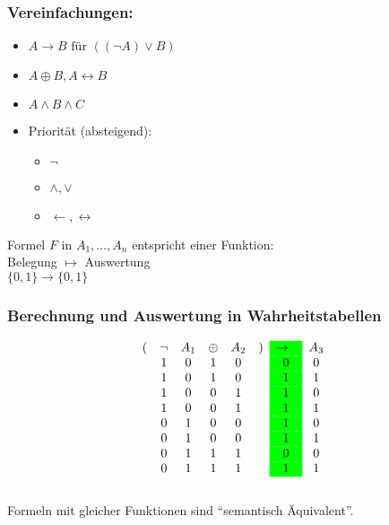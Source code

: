 \subsubsection{Vereinfachungen:}
\begin{itemize}
	\item $A \rightarrow B \text{ für } ( ( \neg A ) \vee B )$
	\item $A \oplus B , A \leftrightarrow B$
	\item $A \wedge B \wedge C$
	\item Priorität (absteigend):
	\begin{itemize}
		\item $\neg$
		\item $\wedge , \vee$
		\item $\leftarrow , \leftrightarrow$
	\end{itemize}
\end{itemize}
Formel $F$ in $A_1 , \dotsc , A_n$ entspricht einer Funktion:\\
Belegung $\mapsto$ Auswertung\\
$\{ 0 , 1 \} \rightarrow \{ 0 , 1 \}$

\subsubsection{Berechnung und Auswertung in Wahrheitstabellen}
\begin{gather*}
	\begin{array}{ c c c c c c >{\columncolor{green}}c c }
		(	& \neg	& A_1	& \oplus	& A_2	& )	& \rightarrow	& A_3	\\
			& 1		& 0		& 1		& 0		&	& 0			& 0		\\
			& 1		& 0		& 1		& 0		&	& 1			& 1		\\
			& 1		& 0		& 0		& 1		&	& 1			& 0		\\
			& 1		& 0		& 0		& 1		&	& 1			& 1		\\
			& 0		& 1		& 0		& 0		&	& 1			& 0		\\
			& 0		& 1		& 0		& 0		&	& 1			& 1		\\
			& 0		& 1		& 1		& 1		&	& 0			& 0		\\
			& 0		& 1		& 1		& 1		&	& 1			& 1		
	\end{array}
\end{gather*}\\
Formeln mit gleicher Funktionen sind \enquote{semantisch Äquivalent}.

